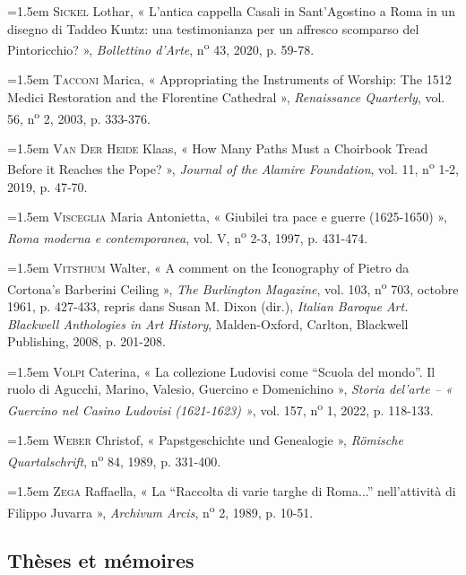 \documentclass[12pt,twoside,openany]{book}
\newenvironment{PurhBibliography}
  {%
    \par
    \setlength{\parindent}{0pt}%
    \setlength{\leftskip}{0pt}%
  }
  {%
    \par
  }
\begin{document}
\begin{PurhBibliography}
\noindent\hangindent=1.5em \textsc{Sickel} Lothar, « L’antica cappella Casali in Sant’Agostino a Roma in un disegno di Taddeo Kuntz: una testimonianza per un affresco scomparso del Pintoricchio? », \textit{Bollettino d’Arte}, n\textsuperscript{o} 43, 2020, p. 59-78.\par
\noindent\hangindent=1.5em \textsc{Tacconi} Marica, « Appropriating the Instruments of Worship: The 1512 Medici Restoration and the Florentine Cathedral », \textit{Renaissance Quarterly}, vol. 56, n\textsuperscript{o} 2, 2003, p. 333-376.\par
\noindent\hangindent=1.5em \textsc{Van Der Heide} Klaas, « How Many Paths Must a Choirbook Tread Before it Reaches the Pope? », \textit{Journal of the Alamire Foundation}, vol. 11, n\textsuperscript{o} 1‑2, 2019, p. 47‑70.\par
\noindent\hangindent=1.5em \textsc{Visceglia} Maria Antonietta, « Giubilei tra pace e guerre (1625-1650) », \textit{Roma moderna e contemporanea}, vol. V, n\textsuperscript{o} 2-3, 1997, p. 431-474.\par
\noindent\hangindent=1.5em \textsc{Vitsthum} Walter, « A comment on the Iconography of Pietro da Cortona’s Barberini Ceiling », \textit{The Burlington Magazine}, vol. 103, n\textsuperscript{o} 703, octobre 1961, p. 427-433, repris dans Susan M. Dixon (dir.), \textit{Italian Baroque Art. Blackwell Anthologies in Art History}, Malden-Oxford, Carlton, Blackwell Publishing, 2008, p. 201-208.\par
\noindent\hangindent=1.5em \textsc{Volpi} Caterina, « La collezione Ludovisi come “Scuola del mondo”. Il ruolo di Agucchi, Marino, Valesio, Guercino e Domenichino », \textit{Storia del’arte – « Guercino nel Casino Ludovisi (1621-1623) »}, vol. 157, n\textsuperscript{o} 1, 2022, p. 118-133.\par
\noindent\hangindent=1.5em \textsc{Weber} Christof, « Papstgeschichte und Genealogie », \textit{Römische Quartalschrift}, n\textsuperscript{o} 84, 1989, p. 331-400.\par
\noindent\hangindent=1.5em \textsc{Zega} Raffaella, « La “Raccolta di varie targhe di Roma...” nell’attività di Filippo Juvarra », \textit{Archivum Arcis}, n\textsuperscript{o} 2, 1989, p. 10-51.\par
\end{PurhBibliography}

\subsection{Thèses et mémoires}
\end{document}

